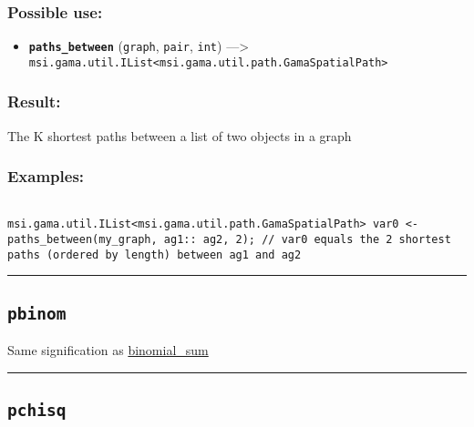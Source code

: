 \documentclass[]{book}
\providecommand{\tightlist}{%
  \setlength{\itemsep}{0pt}\setlength{\parskip}{0pt}}
\theoremstyle{definition}
\theoremstyle{definition}
\theoremstyle{definition}
\theoremstyle{remark}
\begin{document}
\subsubsection{Possible use:}\label{possible-use-397}

\begin{itemize}
\tightlist
\item
  \textbf{\texttt{paths\_between}} (\texttt{graph}, \texttt{pair},
  \texttt{int}) ---\textgreater{}
  \texttt{msi.gama.util.IList\textless{}msi.gama.util.path.GamaSpatialPath\textgreater{}}
\end{itemize}

\subsubsection{Result:}\label{result-383}

The K shortest paths between a list of two objects in a graph

\subsubsection{Examples:}\label{examples-273}

\begin{verbatim}
 
msi.gama.util.IList<msi.gama.util.path.GamaSpatialPath> var0 <- paths_between(my_graph, ag1:: ag2, 2); // var0 equals the 2 shortest paths (ordered by length) between ag1 and ag2
\end{verbatim}

\begin{center}\rule{0.5\linewidth}{\linethickness}\end{center}

\subsection{\texorpdfstring{\texttt{pbinom}}{pbinom}}\label{pbinom}

Same signification as \href{OperatorsBC\#binomial_sum}{binomial\_sum}

\begin{center}\rule{0.5\linewidth}{\linethickness}\end{center}

\subsection{\texorpdfstring{\texttt{pchisq}}{pchisq}}\label{pchisq}
\end{document}
